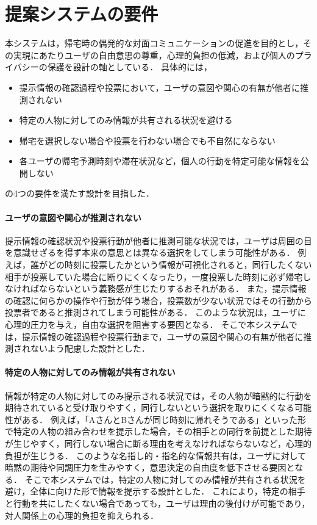 \section{提案システムの要件}
本システムは，帰宅時の偶発的な対面コミュニケーションの促進を目的とし，その実現にあたりユーザの自由意思の尊重，心理的負担の低減，および個人のプライバシーの保護を設計の軸としている．
具体的には，
\begin{itemize}
  \item 提示情報の確認過程や投票において，ユーザの意図や関心の有無が他者に推測されない
  \item 特定の人物に対してのみ情報が共有される状況を避ける
  \item 帰宅を選択しない場合や投票を行わない場合でも不自然にならない
  \item 各ユーザの帰宅予測時刻や滞在状況など，個人の行動を特定可能な情報を公開しない
\end{itemize}
の4つの要件を満たす設計を目指した．


\paragraph{ユーザの意図や関心が推測されない}
提示情報の確認状況や投票行動が他者に推測可能な状況では，ユーザは周囲の目を意識せざるを得ず本来の意思とは異なる選択をしてしまう可能性がある．
例えば，誰がどの時刻に投票したかという情報が可視化されると，同行したくない相手が投票していた場合に断りにくくなったり，一度投票した時刻に必ず帰宅しなければならないという義務感が生じたりするおそれがある．
また，提示情報の確認に何らかの操作や行動が伴う場合，投票数が少ない状況ではその行動から投票者であると推測されてしまう可能性がある．
このような状況は，ユーザに心理的圧力を与え，自由な選択を阻害する要因となる．
そこで本システムでは，提示情報の確認過程や投票行動まで，ユーザの意図や関心の有無が他者に推測されないよう配慮した設計とした．


\paragraph{特定の人物に対してのみ情報が共有されない}
情報が特定の人物に対してのみ提示される状況では，その人物が暗黙的に行動を期待されていると受け取りやすく，同行しないという選択を取りにくくなる可能性がある．
例えば，「AさんとBさんが同じ時刻に帰れそうである」といった形で特定の人物の組み合わせを提示した場合，その相手との同行を前提とした期待が生じやすく，同行しない場合に断る理由を考えなければならないなど，心理的負担が生じうる．
このような名指し的・指名的な情報共有は，ユーザに対して暗黙の期待や同調圧力を生みやすく，意思決定の自由度を低下させる要因となる．
そこで本システムでは，特定の人物に対してのみ情報が共有される状況を避け，全体に向けた形で情報を提示する設計とした．
これにより，特定の相手と行動を共にしたくない場合であっても，ユーザは理由の後付けが可能であり，対人関係上の心理的負担を抑えられる．


